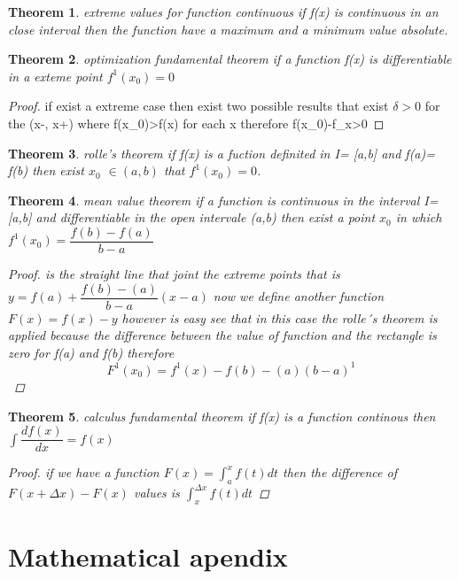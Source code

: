 \documentclass[10pt,a4paper]{article}
\newtheorem{theorem}{Theorem}[section]
\begin{document}
\begin{theorem}{extreme values for function continuous}
if f(x)  is continuous in an close interval then the function have a maximum and a minimum value absolute.
\end{theorem}

\begin{theorem}{optimization fundamental theorem}
if a function f(x) is differentiable in a exteme point $f^{1}(x_{0})=0$ 
\end{theorem}

\begin{proof}
if exist a extreme case then exist two possible results that exist $\delta>0 $  for the (x-\delta, x+\delta) where f(x_{0})>f(x) for each x therefore f(x_{0})-f_{x}>0 
\end{proof}


\begin{theorem}{rolle's theorem}
if f(x) is a fuction definited in I= [a,b] and f(a)= f(b) then exist $x_{0}$ $\in (a,b)$ that $f^{1}(x_{0})=0$.
\end{theorem}

\begin{theorem}{mean value theorem}
if a function is continuous  in the interval I=[a,b] and differentiable in the open intervale (a,b) then exist a point $x_{0}$ in which $f^{1}(x_{0}) =\dfrac{f(b)-f(a)}{b-a}$
\begin{proof}
is the straight line  that joint the extreme points that is 
$y=f(a)+ \dfrac{f(b)-(a)}{b-a}(x-a)$ 
now we define another function $F(x)= f(x)-y$ however is easy see that in this case the rolle´s theorem is applied because  the difference between the  value of function and the rectangle is zero for f(a) and f(b) therefore
$$F^{1}(x_{0})=f^{1}(x)- f(b)-(a)(b-a)^{1}$$
\end{proof}
\end{theorem}


\begin{theorem}{calculus fundamental theorem}
if f(x) is a function continous then $\int\dfrac{df(x)}{dx}= f(x)$
\begin{proof}
if we have a function $F(x)=\int_{a}^{x} f(t)dt$ then the difference of $F(x+ \Delta x) - F(x)$ values is $\int_{x}^{\Delta x} f(t) dt$
\end{proof}
\end{theorem}



\section{Mathematical apendix}
\end{document}

